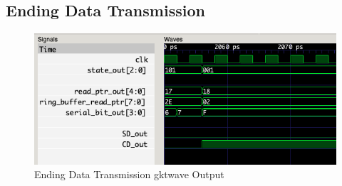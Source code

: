 \subsection{Ending Data Transmission}
\begin{figure}[H]
    \centering
    \includegraphics[width=\columnwidth]{Figures/Jtransmit_end}
    \caption{Ending Data Transmission gktwave Output}
    \label{fig:testJ}
\end{figure}
